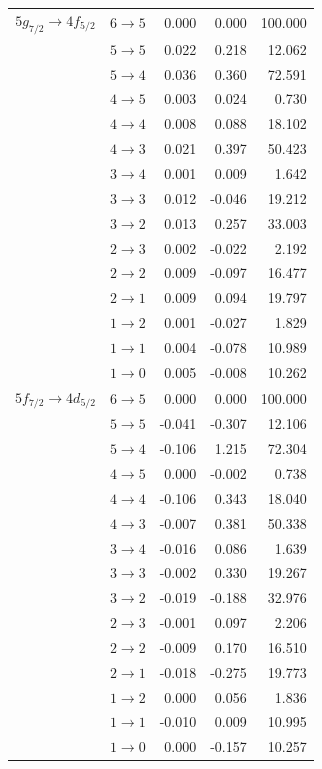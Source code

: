 \begin{table}[b]
\begin{tiny}
\begin{tabular}{cc|rrr}
$5g_{7/2} \rightarrow 4f_{5/2}$  &  $6 \rightarrow 5$  &  0.000  &  0.000  &  100.000\\
&  $5 \rightarrow 5$  &  0.022  &  0.218  &  12.062\\
&  $5 \rightarrow 4$  &  0.036  &  0.360  &  72.591\\
&  $4 \rightarrow 5$  &  0.003  &  0.024  &  0.730\\
&  $4 \rightarrow 4$  &  0.008  &  0.088  &  18.102\\
&  $4 \rightarrow 3$  &  0.021  &  0.397  &  50.423\\
&  $3 \rightarrow 4$  &  0.001  &  0.009  &  1.642\\
&  $3 \rightarrow 3$  &  0.012  &  -0.046  &  19.212\\
&  $3 \rightarrow 2$  &  0.013  &  0.257  &  33.003\\
&  $2 \rightarrow 3$  &  0.002  &  -0.022  &  2.192\\
&  $2 \rightarrow 2$  &  0.009  &  -0.097  &  16.477\\
&  $2 \rightarrow 1$  &  0.009  &  0.094  &  19.797\\
&  $1 \rightarrow 2$  &  0.001  &  -0.027  &  1.829\\
&  $1 \rightarrow 1$  &  0.004  &  -0.078  &  10.989\\
&  $1 \rightarrow 0$  &  0.005  &  -0.008  &  10.262\\[7pt]

$5f_{7/2} \rightarrow 4d_{5/2}$  &  $6 \rightarrow 5$  &  0.000  &  0.000  &  100.000\\
&  $5 \rightarrow 5$  &  -0.041  &  -0.307  &  12.106\\
&  $5 \rightarrow 4$  &  -0.106  &  1.215  &  72.304\\
&  $4 \rightarrow 5$  &  0.000  &  -0.002  &  0.738\\
&  $4 \rightarrow 4$  &  -0.106  &  0.343  &  18.040\\
&  $4 \rightarrow 3$  &  -0.007  &  0.381  &  50.338\\
&  $3 \rightarrow 4$  &  -0.016  &  0.086  &  1.639\\
&  $3 \rightarrow 3$  &  -0.002  &  0.330  &  19.267\\
&  $3 \rightarrow 2$  &  -0.019  &  -0.188  &  32.976\\
&  $2 \rightarrow 3$  &  -0.001  &  0.097  &  2.206\\
&  $2 \rightarrow 2$  &  -0.009  &  0.170  &  16.510\\
&  $2 \rightarrow 1$  &  -0.018  &  -0.275  &  19.773\\
&  $1 \rightarrow 2$  &  0.000  &  0.056  &  1.836\\
&  $1 \rightarrow 1$  &  -0.010  &  0.009  &  10.995\\
&  $1 \rightarrow 0$  &  0.000  &  -0.157  &  10.257\\[7pt]


\end{tabular}
\end{tiny}
\end{table}
